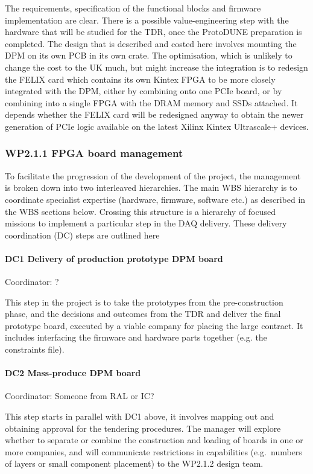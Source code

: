 The requirements, specification of the functional blocks and firmware
implementation are clear.  There is a possible value-engineering step
with the hardware that will be studied for the TDR, once the ProtoDUNE
preparation is completed.  The design that is described and costed
here involves mounting the DPM on its own PCB in its own crate.  The
optimisation, which is unlikely to change the cost to the UK much, but
might increase the integration is to redesign the FELIX card which
contains its own Kintex FPGA to be more closely integrated with the
DPM, either by combining onto one PCIe board, or by combining into a
single FPGA with the DRAM memory and SSDs attached.  It depends
whether the FELIX card will be redesigned anyway to obtain the newer
generation of PCIe logic available on the latest Xilinx Kintex
Ultrascale+ devices.

\subsubsection*{WP2.1.1 FPGA board management}

To facilitate the progression of the development of the project, 
the management is broken down into two interleaved hierarchies.  
The main WBS hierarchy is to coordinate specialist expertise 
(hardware, firmware, software etc.) as described in the WBS 
sections below.  Crossing this structure is a hierarchy of 
focused missions to implement a particular step in the
DAQ delivery.  These delivery coordination (DC) steps are outlined here

\paragraph{DC\/1 Delivery of production prototype DPM board} Coordinator: ?

\noindent
This step in the project is to take the prototypes from the 
pre-construction phase, and the decisions and outcomes from 
the TDR and deliver the final prototype board, executed by a 
viable company for placing the large contract.  It includes 
interfacing the firmware and hardware parts together (e.g. the 
constraints file).  

\paragraph{DC\/2 Mass-produce DPM board} Coordinator: Someone from RAL or IC?

\noindent
This step starts in parallel with DC\/1 above, it involves mapping out 
and obtaining approval for the tendering procedures.  The manager will 
explore whether to separate or combine the construction and loading of 
boards in one or more companies, and will communicate restrictions in 
capabilities (e.g.\ numbers of layers or small component placement) 
to the WP2.1.2 design team.

